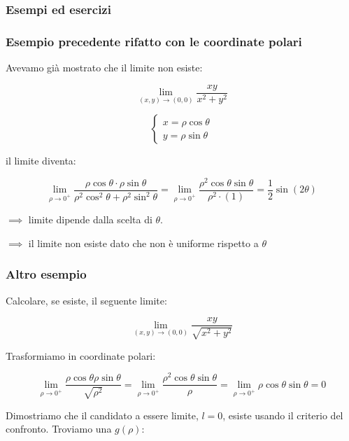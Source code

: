 \pagebreak

\subsubsection{Esempi ed esercizi}

\subsubsection*{Esempio precedente rifatto con le coordinate polari}

Avevamo già mostrato che il limite non esiste:

\[
    \lim_{ (x,y) \to (0,0) } \frac{xy}{x^{2}+y^{2}}
\]

\begin{equation*}
    \begin{cases}
        x = \rho\cos\theta \\
        y = \rho\sin\theta
    \end{cases}
\end{equation*}

il limite diventa:

\[
    \lim_{ \rho \to 0^{+} } \frac{\rho\cos\theta \cdot\rho\sin\theta }{\rho^{2}\cos^{2}\theta  + \rho^{2}\sin^{2}\theta } = \lim_{ \rho \to 0^{+} } \frac{\rho^{2}\cos\theta \sin\theta }{\rho^{2} \cdot (1)} = \frac{1}{2}\sin(2\theta)
\]

\(\implies \) limite dipende dalla scelta di \(\theta \).

\(\implies \) il limite non esiste dato che non è uniforme rispetto a \(\theta \)

\filbreak{}
\subsubsection*{Altro esempio}

Calcolare, se esiste, il seguente limite:

\[
    \lim_{ (x,y) \to (0,0) } \frac{xy}{\sqrt{x^{2}+y^{2}}}
\]

Trasformiamo in coordinate polari:

\[
    \lim_{ \rho \to 0^{+} } \frac{\rho\cos\theta \rho\sin\theta }{\sqrt{\rho^{2}}} = \lim_{ \rho \to 0^{+} } \frac{\rho^{2}\cos\theta \sin\theta }{\rho} = \lim_{ \rho \to 0^{+} } \rho\cos\theta\sin\theta = 0
\]

Dimostriamo che il candidato a essere limite, \(l=0\), esiste usando il criterio del confronto. Troviamo una \(g(\rho)\):

